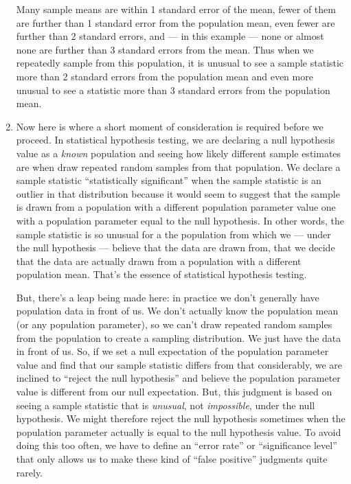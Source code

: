\documentclass[a4paper,12pt]{article}
\begin{document}
\begin{enumerate}
\noindent Many sample means are within 1 standard error of the mean, fewer of them are further than 1 standard error from the population mean, even fewer are further than 2 standard errors, and --- in this example --- none or almost none are further than 3 standard errors from the mean. Thus when we repeatedly sample from this population, it is unusual to see a sample statistic more than 2 standard errors from the population mean and even more unusual to see a statistic more than 3 standard errors from the population mean.

\item Now here is where a short moment of consideration is required before we proceed. In statistical hypothesis testing, we are declaring a null hypothesis value as a \textit{known} population and seeing how likely different sample estimates are when draw repeated random samples from that population. We declare a sample statistic ``statistically significant'' when the sample statistic is an outlier in that distribution because it would seem to suggest that the sample is drawn from a population with a different population parameter value one with a population parameter equal to the null hypothesis. In other words, the sample statistic is so unusual for a the population from which we --- under the null hypothesis --- believe that the data are drawn from, that we decide that the data are actually drawn from a population with a different population mean. That's the essence of statistical hypothesis testing.

But, there's a leap being made here: in practice we don't generally have population data in front of us. We don't actually know the population mean (or any population parameter), so we can't draw repeated random samples from the population to create a sampling distribution. We just have the data in front of us. So, if we set a null expectation of the population parameter value and find that our sample statistic differs from that considerably, we are inclined to ``reject the null hypothesis'' and believe the population parameter value is different from our null expectation. But, this judgment is based on seeing a sample statistic that is \textit{unusual}, not \textit{impossible}, under the null hypothesis. We might therefore reject the null hypothesis sometimes when the population parameter actually is equal to the null hypothesis value. To avoid doing this too often, we have to define an ``error rate'' or ``significance level'' that only allows us to make these kind of ``false positive'' judgments quite rarely.


\end{enumerate}
\end{document}
